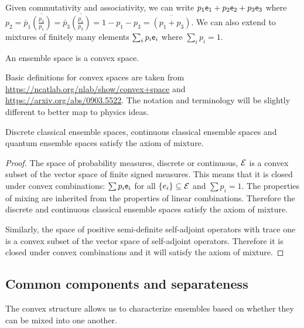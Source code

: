 \begin{remark}
	Given commutativity and associativity, we can write $p_1 \mathsf{e}_1 + p_2 \mathsf{e}_2 + p_3 \mathsf{e}_3$ where $p_2 = \bar{p}_1\overline{\left(\frac{p_3}{\bar{p}_1}\right)} = \bar{p}_3\overline{\left(\frac{p_1}{\bar{p}_3}\right)} = 1 - p_1 - p_3 = \overline{\left(p_1 + p_3\right)}$. We can also extend to mixtures of finitely many elements $\sum_i p_i \mathsf{e}_i$ where $\sum_i p_i = 1$.
\end{remark}

\begin{coro}
	An ensemble space is a convex space.
\end{coro}

\begin{remark}
	Basic definitions for convex spaces are taken from \url{https://ncatlab.org/nlab/show/convex+space} and \url{https://arxiv.org/abs/0903.5522}. The notation and terminology will be slightly different to better map to physics ideas. 
\end{remark}

\begin{prop}
	Discrete classical ensemble spaces, continuous classical ensemble spaces and quantum ensemble spaces satisfy the axiom of mixture.
\end{prop}

\begin{proof}
	The space of probability measures, discrete or continuous, $\mathcal{E}$ is a convex subset of the vector space of finite signed measures. This means that it is closed under convex combinations: $\sum p_i \mathsf{e}_i$ for all $\{e_i\} \subseteq \mathcal{E}$ and $\sum p_i = 1$. The properties of mixing are inherited from the properties of linear combinations. Therefore the discrete and continuous classical ensemble spaces satisfy the axiom of mixture.
	
	Similarly, the space of positive semi-definite self-adjoint operators with trace one is a convex subset of the vector space of self-adjoint operators. Therefore it is closed under convex combinations and it will satisfy the axiom of mixture.
\end{proof}

\subsection{Common components and separateness}

The convex structure allows us to characterize ensembles based on whether they can be mixed into one another.


